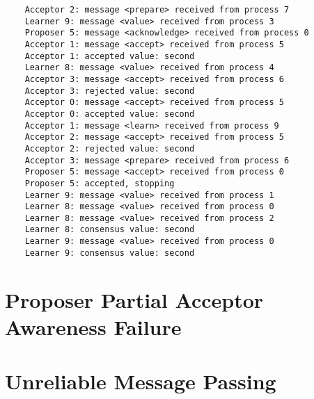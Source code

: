 \documentclass[a4paper, 12pt]{article}
\begin{document}
\begin{lstlisting}
    Acceptor 2: message <prepare> received from process 7
    Learner 9: message <value> received from process 3
    Proposer 5: message <acknowledge> received from process 0
    Acceptor 1: message <accept> received from process 5
    Acceptor 1: accepted value: second
    Learner 8: message <value> received from process 4
    Acceptor 3: message <accept> received from process 6
    Acceptor 3: rejected value: second
    Acceptor 0: message <accept> received from process 5
    Acceptor 0: accepted value: second
    Acceptor 1: message <learn> received from process 9
    Acceptor 2: message <accept> received from process 5
    Acceptor 2: rejected value: second
    Acceptor 3: message <prepare> received from process 6
    Proposer 5: message <accept> received from process 0
    Proposer 5: accepted, stopping
    Learner 9: message <value> received from process 1
    Learner 8: message <value> received from process 0
    Learner 8: message <value> received from process 2
    Learner 8: consensus value: second
    Learner 9: message <value> received from process 0
    Learner 9: consensus value: second
\end{lstlisting}

\section{Proposer Partial Acceptor Awareness Failure}\label{app:partial:fail}

\section{Unreliable Message Passing}\label{app:unreliable}
\end{document}

